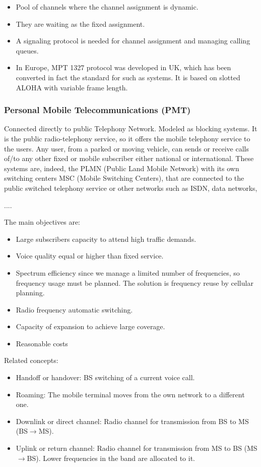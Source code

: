 \documentclass[../main.tex]{subfiles}
\begin{document}
\begin{itemize}
	\item Pool of channels where the channel assignment is dynamic.
	\item They are waiting as the fixed assignment.
	\item A signaling protocol is needed for channel assignment and managing calling queues.
	\item In Europe, MPT 1327 protocol was developed in UK, which has been converted in fact the standard for such as systems. It is based on slotted ALOHA with variable frame length.
\end{itemize}

\subsubsection{Personal Mobile Telecommunications (PMT)}

Connected directly to public Telephony Network. Modeled as blocking systems. It is the public radio-telephony service, so it offers the mobile telephony service to the users. Any user, from a parked or moving vehicle, can sends or receive calls of/to any other fixed or mobile subscriber either national or international. These systems are, indeed, the PLMN (Public Land Mobile Network) with its own switching centers MSC (Mobile Switching Centers), that are connected to the public switched telephony service or other networks such as ISDN, data networks,

....

The main objectives are:
\begin{itemize}
	\item Large subscribers capacity to attend high traffic demands.
	\item Voice quality equal or higher than fixed service.
	\item Spectrum efficiency since we manage a limited number of frequencies, so frequency usage must be planned. The solution is frequency reuse by cellular planning.
	\item Radio frequency automatic switching.
	\item Capacity of expansion to achieve large coverage.
	\item Reasonable costs
\end{itemize}

Related concepts:
\begin{itemize}
	\item Handoff or handover: BS switching of a current voice call.
	\item Roaming: The mobile terminal moves from the own network to a different one.
	\item Downlink or direct channel: Radio channel for transmission from BS to MS (BS$\rightarrow$MS).
	\item Uplink or return channel: Radio channel for transmission from MS to BS (MS$\rightarrow$BS). Lower frequencies in the band are allocated to it.
\end{itemize}
\end{document}
